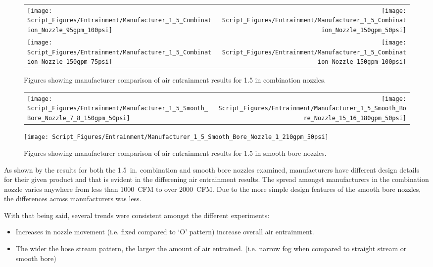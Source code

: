 \documentclass{article}
\begin{document}
\clearpage

\begin{figure}[!ht]
\begin{tabular*}{\textwidth}{lr}
\texttt{[image: Script\_Figures/Entrainment/Manufacturer\_1\_5\_Combination\_Nozzle\_95gpm\_100psi]} &
\texttt{[image: Script\_Figures/Entrainment/Manufacturer\_1\_5\_Combination\_Nozzle\_150gpm\_50psi]} \\
\texttt{[image: Script\_Figures/Entrainment/Manufacturer\_1\_5\_Combination\_Nozzle\_150gpm\_75psi]} &
\texttt{[image: Script\_Figures/Entrainment/Manufacturer\_1\_5\_Combination\_Nozzle\_150gpm\_100psi]} \\
\end{tabular*}
\caption{Figures showing manufacturer comparison of air entrainment results for 1.5 in combination nozzles.}
\label{fig:1_5_Interior_Combination_Manufacturer}
\end{figure}

\clearpage

\begin{figure}[!ht]
\begin{tabular*}{\textwidth}{lr}
\texttt{[image: Script\_Figures/Entrainment/Manufacturer\_1\_5\_Smooth\_Bore\_Nozzle\_7\_8\_150gpm\_50psi]} &
\texttt{[image: Script\_Figures/Entrainment/Manufacturer\_1\_5\_Smooth\_Bore\_Nozzle\_15\_16\_180gpm\_50psi]} \\
\end{tabular*}
\centering
\texttt{[image: Script\_Figures/Entrainment/Manufacturer\_1\_5\_Smooth\_Bore\_Nozzle\_1\_210gpm\_50psi]} 
\caption{Figures showing manufacturer comparison of air entrainment results for 1.5 in smooth bore nozzles.}
\label{fig:1_5_Interior_Smooth_Bore_Manufacturer}
\end{figure}

As shown by the results for both the 1.5~in. combination and smooth bore nozzles examined, manufacturers have different design details for their given product and that is evident in the differening air entrainment results. The spread amongst manufacturers in the combination nozzle varies anywhere from less than 1000~CFM to over 2000~CFM. Due to the more simple design features of the smooth bore nozzles, the differences across manufacturers was less.

With that being said, several trends were consistent amongst the different experiments:

\begin{itemize}
	\item Increases in nozzle movement (i.e. fixed compared to `O' pattern) increase overall air entrainment.
	\item The wider the hose stream pattern, the larger the amount of air entrained. (i.e. narrow fog when compared to straight stream or smooth bore)
\end{itemize}
\end{document}
